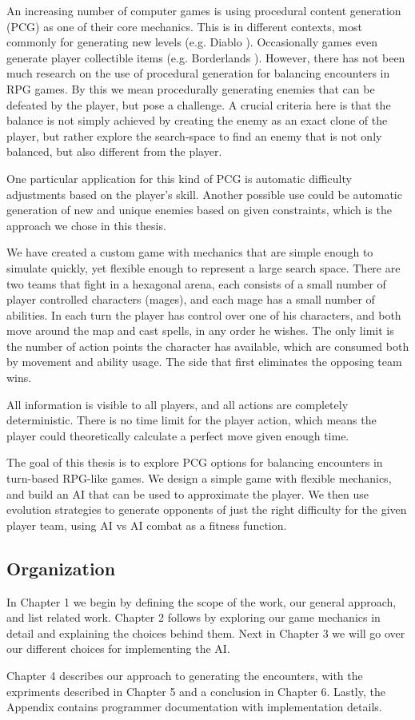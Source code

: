 
An increasing number of computer games is using procedural content generation
(PCG) as one of their core mechanics. This is in different contexts, most
commonly for generating new levels (e.g. Diablo \citep{diablo}). Occasionally games
even generate player collectible items (e.g. Borderlands \citep{borderlands}). However,
there has not been much research on the use of procedural generation for
balancing encounters in RPG games. By this we mean procedurally generating
enemies that can be defeated by the player, but pose a challenge. A crucial
criteria here is that the balance is not simply achieved by creating the enemy
as an exact clone of the player, but rather explore the search-space to find an
enemy that is not only balanced, but also different from the player.

One particular application for this kind of PCG is automatic difficulty
adjustments based on the player's skill. Another possible use could be
automatic generation of new and unique enemies based on given constraints,
which is the approach we chose in this thesis.

We have created a custom game with mechanics that are simple enough to simulate
quickly, yet flexible enough to represent a large search space. There are two
teams that fight in a hexagonal arena, each consists of a small number of
player controlled characters (mages), and each mage has a small number of
abilities. In each turn the player has control over one of his characters, and
both move around the map and cast spells, in any order he wishes. The only
limit is the number of action points the character has available, which are
consumed both by movement and ability usage. The side that first eliminates the
opposing team wins.

All information is visible to all players, and all actions are completely
deterministic. There is no time limit for the player action, which means the
player could theoretically calculate a perfect move given enough time.

The goal of this thesis is to explore PCG options for balancing encounters in
turn-based RPG-like games. We design a simple game with flexible mechanics, and
build an AI that can be used to approximate the player. We then use evolution strategies
to generate opponents of just the right difficulty for the given player team, using AI vs
AI combat as a fitness function.

\subsection*{Organization}

In Chapter 1 we begin by defining the scope of the work, our general approach,
and list related work. Chapter 2 follows by exploring our game mechanics in
detail and explaining the choices behind them. Next in Chapter 3 we will go
over our different choices for implementing the AI.

Chapter 4 describes our approach to generating the encounters, with the expriments
described in Chapter 5 and a conclusion in Chapter 6. Lastly, the Appendix contains
programmer documentation with implementation details.
